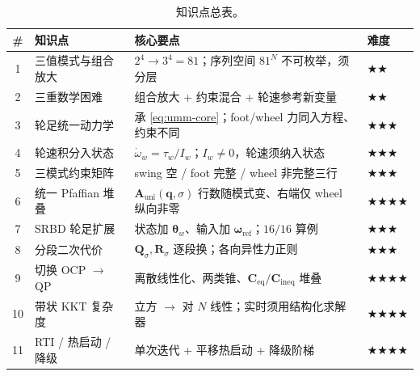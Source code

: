 \begin{table}[H]\centering\small
\caption{知识点总表。}
\label{tab:wl-points}
\begin{tabular}{clll}
\toprule
\# & 知识点 & 核心要点 & 难度 \\
\midrule
1 & 三值模式与组合放大 & $2^4\!\to\!3^4=81$；序列空间 $81^N$ 不可枚举，须分层 & \(\bigstar\bigstar\) \\
2 & 三重数学困难 & 组合放大 + 约束混合 + 轮速参考新变量 & \(\bigstar\bigstar\) \\
3 & 轮足统一动力学 & 承 \cref{eq:umm-core}；foot/wheel 力同入方程、约束不同 & \(\bigstar\bigstar\bigstar\) \\
4 & 轮速积分入状态 & $\dot\omega_w=\tau_w/I_w$；$I_w\!\neq\!0$，轮速须纳入状态 & \(\bigstar\bigstar\bigstar\) \\
5 & 三模式约束矩阵 & swing 空 / foot 完整 / wheel 非完整三行 & \(\bigstar\bigstar\bigstar\) \\
6 & 统一 Pfaffian 堆叠 & $\mathbf{A}_{\mathrm{uni}}(\mathbf{q},\sigma)$ 行数随模式变、右端仅 wheel 纵向非零 & \(\bigstar\bigstar\bigstar\bigstar\) \\
7 & SRBD 轮足扩展 & 状态加 $\boldsymbol\theta_w$、输入加 $\boldsymbol\omega_{\mathrm{ref}}$；$16/16$ 算例 & \(\bigstar\bigstar\bigstar\) \\
8 & 分段二次代价 & $\mathbf{Q}_\sigma,\mathbf{R}_\sigma$ 逐段换；各向异性力正则 & \(\bigstar\bigstar\bigstar\) \\
9 & 切换 OCP $\to$ QP & 离散线性化、两类锥、$\mathbf{C}_{\mathrm{eq}}/\mathbf{C}_{\mathrm{ineq}}$ 堆叠 & \(\bigstar\bigstar\bigstar\bigstar\) \\
10 & 带状 KKT 复杂度 & 立方 $\to$ 对 $N$ 线性；实时须用结构化求解器 & \(\bigstar\bigstar\bigstar\bigstar\) \\
11 & RTI / 热启动 / 降级 & 单次迭代 + 平移热启动 + 降级阶梯 & \(\bigstar\bigstar\bigstar\bigstar\) \\
\bottomrule
\end{tabular}
\end{table}
